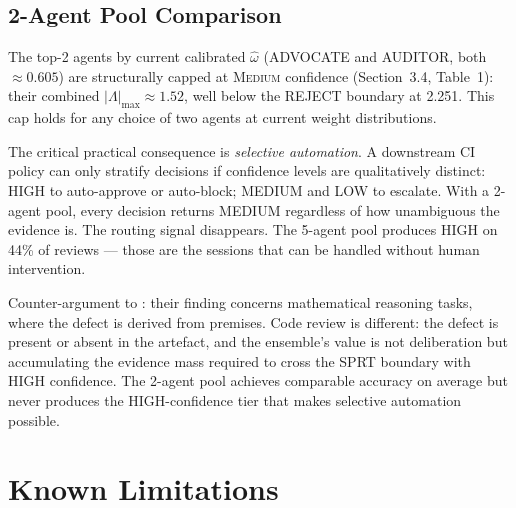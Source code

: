 \documentclass[11pt,a4paper]{article}
\begin{document}
\subsection{2-Agent Pool Comparison}

The top-2 agents by current calibrated $\hat\omega$ (ADVOCATE and AUDITOR,
both $\approx 0.605$) are structurally capped at \textsc{Medium} confidence
(Section~3.4, Table~1): their combined $|\Lambda|_{\max} \approx 1.52$, well
below the REJECT boundary at 2.251. This cap holds for any choice of two
agents at current weight distributions.

The critical practical consequence is \emph{selective automation}. A downstream
CI policy can only stratify decisions if confidence levels are qualitatively
distinct: HIGH to auto-approve or auto-block; MEDIUM and LOW to escalate.
With a 2-agent pool, every decision returns MEDIUM regardless of how
unambiguous the evidence is. The routing signal disappears. The 5-agent pool
produces HIGH on 44\% of reviews — those are the sessions that can be handled
without human intervention.

Counter-argument to \cite{single2026}: their finding concerns mathematical
reasoning tasks, where the defect is derived from premises. Code review is
different: the defect is present or absent in the artefact, and the ensemble's
value is not deliberation but accumulating the evidence mass required to cross
the SPRT boundary with HIGH confidence. The 2-agent pool achieves comparable
accuracy on average but never produces the HIGH-confidence tier that makes
selective automation possible.

\section{Known Limitations}
\end{document}
